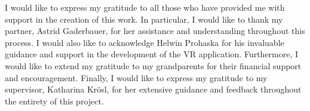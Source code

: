 \documentclass[draft, final]{vutinfth} %
\begin{document}
\frontmatter %

\addstatementpage

\begin{acknowledgements*}
  I would like to express my gratitude to all those who have provided me with support in the creation of this work. In particular, I would like to thank my partner, Astrid Gaderbauer, for her assistance and understanding throughout this process. I would also like to acknowledge Helwin Prohaska for his invaluable guidance and support in the development of the VR application. Furthermore, I would like to extend my gratitude to my grandparents for their financial support and encouragement. Finally, I would like to express my gratitude to my supervisor, Katharina Krösl, for her extensive guidance and feedback throughout the entirety of this project.

\end{acknowledgements*}

\end{document}
